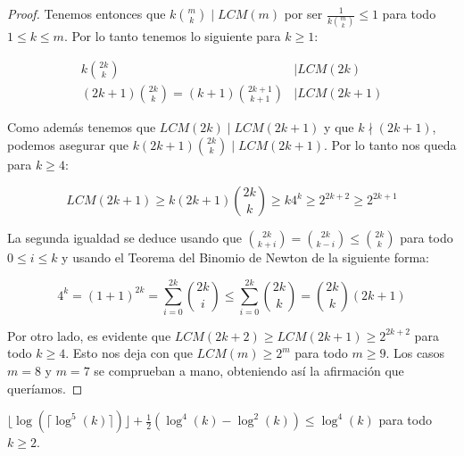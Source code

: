 \begin{proof}
	Tenemos entonces que $k\binom{m}{k} \mid LCM(m)$ por ser $\frac{1}{k\binom{m}{k}} \leq 1$ para todo $1 \leq k \leq m$. Por lo tanto tenemos lo siguiente para $k \geq 1$:
	
	\begin{align}
	k\binom{2k}{k} &\mid LCM(2k)\\
	(2k+1)\binom{2k}{k} = (k+1)\binom{2k+1}{k+1} &\mid LCM(2k+1)
	\end{align}
	
	Como además tenemos que $LCM(2k) \mid LCM(2k+1)$ y que $k \nmid (2k+1)$, podemos asegurar que $k(2k+1)\displaystyle\binom{2k}{k} \mid LCM(2k+1)$. Por lo tanto nos queda para $k \geq 4$:
	
	\[ LCM(2k+1) \geq k(2k+1)\binom{2k}{k} \geq k4^k \geq 2^{2k+2} \geq 2^{2k+1} \]
	
	La segunda igualdad se deduce usando que $\displaystyle\binom{2k}{k+i} = \binom{2k}{k-i} \leq \binom{2k}{k}$ para todo $0 \leq i \leq k$ y usando el Teorema del Binomio de Newton de la siguiente forma:
	
	\[ 4^k = (1+1)^{2k} = \sum_{i=0}^{2k}\binom{2k}{i} \leq \sum_{i=0}^{2k}\binom{2k}{k} = \binom{2k}{k}(2k+1) \]
	
	Por otro lado, es evidente que $LCM(2k+2) \geq LCM(2k+1) \geq 2^{2k+2}$ para todo $k \geq 4$. Esto nos deja con que $LCM(m) \geq 2^m$ para todo $m \geq 9$. Los casos $m = 8$ y $m = 7$ se comprueban a mano, obteniendo así la afirmación que queríamos.
\end{proof}

\begin{lema}\label{desigualdad_log4_log2}
	$\lfloor \log(\lceil \log^5(k) \rceil) \rfloor + \frac{1}{2}\left( \log^4(k) - \log^2(k) \right) \leq \log^4(k)$ para todo $k \geq 2$.
\end{lema}


